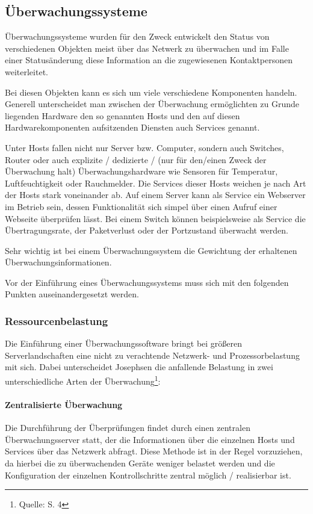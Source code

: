 \subsection{Überwachungssysteme}
\label{monitor}
Überwachungssysteme wurden für den Zweck entwickelt den Status von verschiedenen Objekten meist über das Netwerk zu überwachen und im Falle einer Statusänderung diese Information an die zugewiesenen Kontaktpersonen weiterleitet.

Bei diesen Objekten kann es sich um viele verschiedene Komponenten handeln.
Generell unterscheidet man zwischen der Überwachung ermöglichten zu Grunde liegenden Hardware den so genannten Hosts und den auf diesen Hardwarekomponenten aufsitzenden Diensten auch Services genannt.

Unter Hosts fallen nicht nur Server bzw. Computer, sondern auch Switches, Router oder auch explizite / dedizierte / (nur für den/einen Zweck der Überwachung halt) Überwachungshardware wie Sensoren für Temperatur, Luftfeuchtigkeit oder Rauchmelder.
Die Services dieser Hosts weichen je nach Art der Hosts stark voneinander ab.
Auf einem Server kann als Service ein Webserver im Betrieb sein, dessen Funktionalität sich simpel über einen Aufruf einer Webseite überprüfen lässt.
Bei einem Switch können beispielsweise als Service die Übertragungsrate, der Paketverlust oder der Portzustand überwacht werden.

Sehr wichtig ist bei einem Überwachungssystem die Gewichtung der erhaltenen Überwachungsinformationen.


\newpage
Vor der Einführung eines Überwachungssystems muss sich mit den folgenden Punkten auseinandergesetzt werden.

\subsubsection{Ressourcenbelastung}
Die Einführung einer Überwachungssoftware bringt bei größeren Serverlandschaften eine nicht zu verachtende Netzwerk- und Prozessorbelastung mit sich.
Dabei unterscheidet Josephsen die anfallende Belastung in zwei unterschiedliche Arten der Überwachung\footnote{Quelle: \cite{Jose07} S. 4}:

\paragraph{Zentralisierte Überwachung}
Die Durchführung der Überprüfungen findet durch einen zentralen Überwachungsserver statt, der die Informationen über die einzelnen Hosts und Services über das Netzwerk abfragt.
Diese Methode ist in der Regel vorzuziehen, da hierbei die zu überwachenden Geräte weniger belastet werden und die Konfiguration der einzelnen Kontrollschritte zentral möglich / realisierbar ist.

